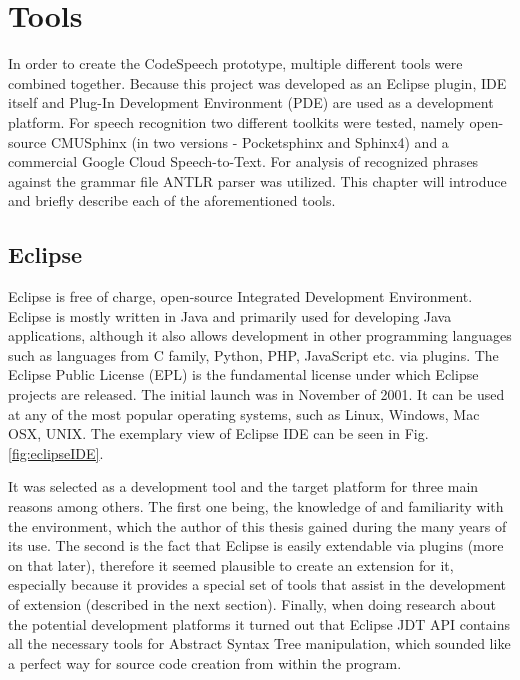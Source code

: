 \chapter{Tools}
\label{cha:Tools}

In order to create the CodeSpeech prototype, multiple different tools were combined together. Because this project was developed as an Eclipse plugin, IDE itself and Plug-In Development Environment (PDE) are used as a development platform. For speech recognition two different toolkits were tested, namely open-source CMUSphinx (in two versions - Pocketsphinx and Sphinx4) and a commercial Google Cloud Speech-to-Text. For analysis of recognized phrases against the grammar file ANTLR parser was utilized. This chapter will introduce and briefly describe each of the aforementioned tools.

\section{Eclipse}

Eclipse is free of charge, open-source Integrated Development Environment. Eclipse is mostly written in Java and primarily used for developing Java applications, although it also allows development in other programming languages such as languages from C family, Python, PHP, JavaScript etc. via plugins. The Eclipse Public License (EPL) is the fundamental license under which Eclipse projects are released. The initial launch was in November of 2001. It can be used at any of the most popular operating systems, such as Linux, Windows, Mac OSX, UNIX. The exemplary view of Eclipse IDE can be seen in Fig. \ref{fig:eclipseIDE}.

It was selected as a development tool and the target platform for three main reasons among others. The first one being, the knowledge of and familiarity with the environment, which the author of this thesis gained during the many years of its use. The second is the fact that Eclipse is easily extendable via plugins (more on that later), therefore it seemed plausible to create an extension for it, especially because it provides a special set of tools that assist in the development of extension (described in the next section). Finally, when doing research about the potential development platforms it turned out that Eclipse JDT API contains all the necessary tools for Abstract Syntax Tree manipulation, which sounded like a perfect way for source code creation from within the program.

